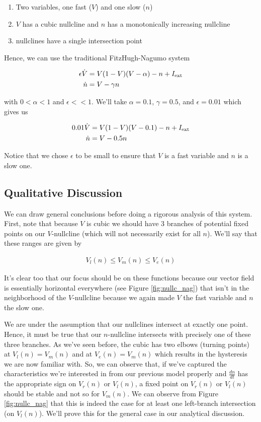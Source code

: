 \documentclass{article}
\begin{document}
\begin{enumerate}
    \item Two variables, one fast ($V$) and one slow ($n$)
    \item $V$ has a cubic nullcline and $n$ has a monotonically increasing nullcline
    \item nullclines have a single intersection point
\end{enumerate}

Hence, we can use the traditional FitzHugh-Nagumo system

\begin{align*}
    \epsilon {\dot  {V} }&= V(1-V)(V-\alpha) -n+I_{{{\rm {ext}}}} \\
     {\dot  {n}}&=V-\gamma n
\end{align*}

with $0<\alpha<1$ and $\epsilon << 1$. We'll take $\alpha = 0.1$, $\gamma = 0.5$, and $\epsilon = 0.01$ which gives us

\begin{align*}
    0.01 {\dot  {V} }&= V(1-V)(V-0.1) -n+I_{{{\rm {ext}}}} \\
     {\dot  {n}}&=V-0.5 n
\end{align*}

Notice that we chose $\epsilon$ to be small to ensure that $V$ is a fast variable and $n$ is a slow one. 

\subsection{Qualitative Discussion}

We can draw general conclusions before doing a rigorous analysis of this system. First, note that because $V$ is cubic we should have 3 branches of potential fixed points on our $V$-nullcline (which will not necessarily exist for all $n$). We'll say that these ranges are given by 

\begin{align*}
    V_l(n) \leq V_m(n) \leq V_e(n)
\end{align*}

It's clear too that our focus should be on these functions because our vector field is essentially horizontal everywhere (see Figure \ref{fig:nullc_nag}) that isn't in the neighborhood of the $V$-nullcline because we again made $V$ the fast variable and $n$ the slow one. 

We are under the assumption that our nullclines intersect at exactly one point. Hence, it must be true that our $n$-nullcline intersects with precisely one of these three branches. As we've seen before, the cubic has two elbows (turning points) at $V_l(n)=V_m(n)$ and at $V_e(n)=V_m(n)$ which results in the hysteresis we are now familiar with. So, we can observe that, if we've captured the characteristics we're interested in from our previous model properly and $\frac{dn}{dt}$ has the appropriate sign on $V_r(n)$ or $V_l(n)$, a fixed point on $V_r(n)$ or $V_l(n)$ should be stable and not so for $V_m(n)$. We can observe from Figure \ref{fig:nullc_nag} that this is indeed the case for at least one left-branch intersection (on $V_l(n)$). We'll prove this for the general case in our analytical discussion. 
\end{document}
